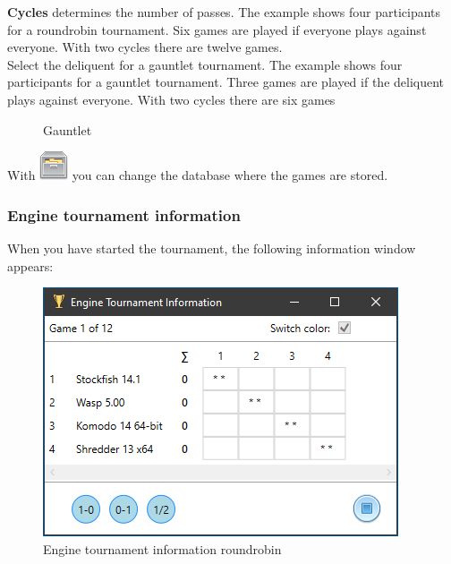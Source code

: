 \documentclass[11pt,a4paper]{article}
\begin{document}
\textbf{Cycles} determines the number of passes. The example shows four participants for a roundrobin tournament. Six games are played if everyone plays against everyone. With two cycles there are twelve games.\\

Select the deliquent for a gauntlet tournament.  The example shows four participants for a gauntlet tournament. Three games are played if the deliquent plays against everyone. With two cycles there are six games


\begin{figure}[H]
	\centering 
	\caption{Gauntlet}
	\label{fig:EngineTournament4}
\end{figure}


With \includegraphics[scale=0.5]{file_manager.png} you can change the database where the games are stored.

\subsubsection{Engine tournament information}

When you have started the tournament, the following information window appears:

\begin{figure}[H]
	\centering
	\includegraphics[scale=1.0]{EngineTournament5.png}
	\caption{Engine tournament information roundrobin}
	\label{fig:EngineTournameent5}
\end{figure}
\end{document}

